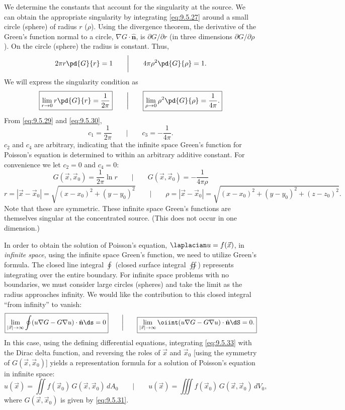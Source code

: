 We determine the constants that account for the singularity at the source.  We can obtain the appropriate singularity by integrating \eqref{eq:9.5.27} around a small circle (sphere) of radius $r$ ($\rho$).  Using the divergence theorem, the derivative of the Green's function normal to a circle, $\nabla G\cdot\hat{\mathbf{n}}$, is $\partial G/\partial r$ (in three dimensions $\partial G/\partial\rho$).  On the circle (sphere) the radius is constant.  Thus,
\[
2\pi r\pd{G}{r} = 1 \qquad\bigg|\qquad 4\pi\rho^2\pd{G}{\rho} = 1.
\]
We will express the singularity condition as
\begin{equation}
\label{eq:9.5.30}
\boxed{\lim_{r\to 0} r\pd{G}{r} = \frac{1}{2\pi}} \qquad\bigg|\qquad \boxed{\lim_{\rho\to 0}\rho^2\pd{G}{\rho} = \frac{1}{4\pi}.}
\end{equation}
From \eqref{eq:9.5.29} and \eqref{eq:9.5.30},
\[
c_1 = \frac{1}{2\pi} \qquad\bigg|\qquad c_3 = -\frac{1}{4\pi}.
\]
$c_2$ and $c_4$ are arbitrary, indicating that the infinite space Green's function for Poisson's equation is determined to within an arbitrary additive constant.  For convenience we let $c_2 = 0$ and $c_4 = 0$:
\begin{equation}
\label{eq:9.5.31}
\boxed{G(\vec{x},\vec{x}_0) = \frac{1}{2\pi}\ln r} \qquad\bigg|\qquad \boxed{G(\vec{x},\vec{x}_0) = -\frac{1}{4\pi\rho}}
\end{equation}
\[
r = |\vec{x}-\vec{x}_0| = \sqrt{(x-x_0)^2+(y-y_0)^2} \qquad\bigg|\qquad \rho = |\vec{x}-\vec{x}_0| = \sqrt{(x-x_0)^2+(y-y_0)^2+(z-z_0)^2}.
\]
Note that these are symmetric.  These infinite space Green's functions are themselves singular at the concentrated source.  (This does not occur in one dimension.)

In order to obtain the solution of Poisson's equation, $\laplacian u = f(\vec{x})$, in \emph{infinite space}, using the infinite space Green's function, we need to utilize Green's formula.  The closed line integral $\oint$ (closed surface integral $\oiint$) represents integrating over the entire boundary.  For infinite space problems with no boundaries, we must consider large circles (spheres) and take the limit as the radius approaches infinity.  We would like the contribution to this closed integral ``from infinity'' to vanish:
\begin{equation}
\label{eq:9.5.33}
\boxed{\lim_{|\vec{x}|\to\infty}\oint (u\nabla G - G\nabla u)\cdot\hat{\mathbf{n}}\ds = 0} \qquad\bigg|\qquad \boxed{\lim_{|\vec{x}|\to\infty}\oiint (u\nabla G - G\nabla u)\cdot\hat{\mathbf{n}}\dS = 0.}
\end{equation}
In this case, using the defining differential equations, integrating \eqref{eq:9.5.33} with the Dirac delta function, and reversing the roles of $\vec{x}$ and $\vec{x}_0$ [using the symmetry of $G(\vec{x},\vec{x}_0)$] yields a representation formula for a solution of Poisson's equation in infinite space:
\begin{equation}
\label{eq:9.5.34}
\boxed{u(\vec{x}) = \iint f(\vec{x}_0)\,G(\vec{x},\vec{x}_0)\,dA_0} \qquad\bigg|\qquad \boxed{u(\vec{x}) = \iiint f(\vec{x}_0)\,G(\vec{x},\vec{x}_0)\,dV_0,}
\end{equation}
where $G(\vec{x},\vec{x}_0)$ is given by \eqref{eq:9.5.31}.

